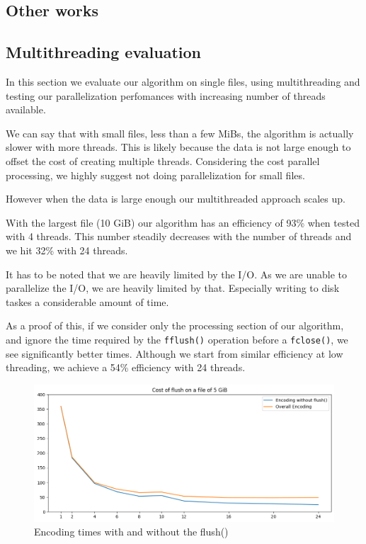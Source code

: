 \subsection{Other works}

\subsection{Multithreading evaluation}
In this section we evaluate our algorithm on single files, using multithreading and testing our parallelization perfomances with increasing number of threads available.

We can say that with small files, less than a few MiBs, the algorithm is actually slower with more threads. 
This is likely because the data is not large enough to offset the cost of creating multiple threads. Considering the cost parallel processing, we highly suggest not doing parallelization for small files.

However when the data is large enough our multithreaded approach scales up.

With the largest file (10 GiB) our algorithm has an efficiency of 93\% when tested with 4 threads. This number steadily decreases with the number of threads and we hit 32\% with 24 threads.

It has to be noted that we are heavily limited by the I/O. As we are unable to parallelize the I/O, we are heavily limited by that. Especially writing to disk taskes a considerable amount of time.

As a proof of this, if we consider only the processing section of our algorithm, and ignore the time required by the \verb|fflush()| operation before a \verb|fclose()|, we see significantly better times. Although we start from similar efficiency at low threading, we achieve a 54\% efficiency with 24 threads.

\begin{figure}
	\centering
	\includegraphics[width=0.8\linewidth]{"../imgs/Flush vs non Flush"}
	\caption{Encoding times with and without the flush()}
	\label{fig:flush-vs-non-flush}
\end{figure}
 
